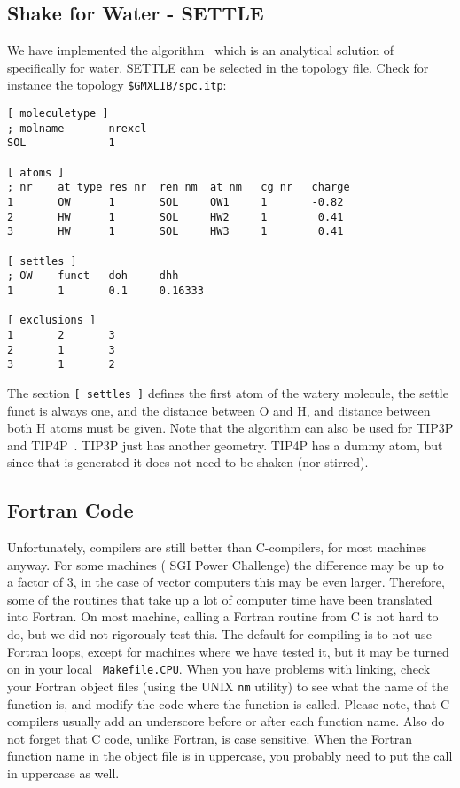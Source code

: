 \subsection{Shake for Water - SETTLE}
\label{sec:settle}
We have implemented the  algorithm~\cite{Miyamoto92} which is
an analytical solution of  specifically for water. 
SETTLE can be selected in the topology file. Check for instance the
topology {\tt \$GMXLIB/spc.itp}:
\begin{verbatim}
[ moleculetype ]
; molname       nrexcl
SOL             1

[ atoms ]
; nr    at type res nr  ren nm  at nm   cg nr   charge
1       OW      1       SOL     OW1     1       -0.82
2       HW      1       SOL     HW2     1        0.41
3       HW      1       SOL     HW3     1        0.41

[ settles ]
; OW    funct   doh     dhh
1       1       0.1     0.16333

[ exclusions ]
1       2       3
2       1       3
3       1       2
\end{verbatim}
The section {\tt [ settles ]} defines the first atom of the watery molecule,
the settle funct is always one, and the distance between O and H, and distance
between both H atoms must be given. Note that the algorithm can also be used
for TIP3P and TIP4P~\cite{Jorgensen83}.
TIP3P just has another geometry. TIP4P has a dummy atom, but since 
that is generated it does not need to be shaken (nor stirred).

\subsection{Fortran Code}
Unfortunately,  compilers are still better than
C-compilers, for most machines anyway. For some machines ({\eg} SGI
Power Challenge) the difference may be up to a factor of 3, in the
case of vector computers this may be even larger. Therefore, some of
the routines that take up a lot of computer time have been translated
into Fortran. On most machine, calling a Fortran routine from C is not
hard to do, but we did not rigorously test this. The default for
compiling {\gromacs} is to not use Fortran loops, except for machines
where we have tested it, but it may be turned on in your local {\tt
Makefile.CPU}. When you have problems with linking, check your Fortran
object files (using the UNIX {\tt nm} utility) to see what the name of
the function is, and modify the code where the function is
called. Please note, that C-compilers usually add an underscore before
or after each function name. Also do not forget that C code, unlike
Fortran, is case sensitive. When the Fortran function name in the
object file is in uppercase, you probably need to put the call in
uppercase as well.

